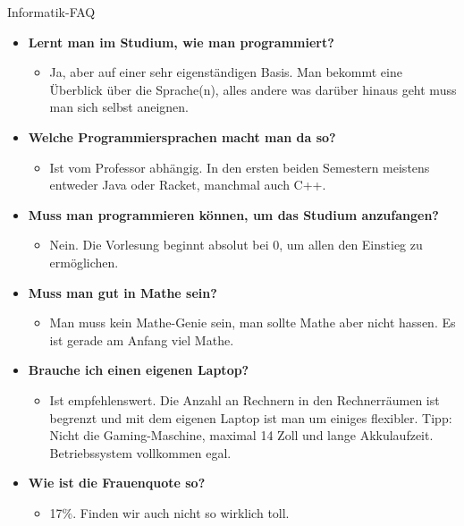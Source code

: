 \begin{LARGE}
	Informatik-FAQ
\end{LARGE}
\begin{large}
\begin{itemize}
		\item \textbf{Lernt man im Studium, wie man programmiert?}
		\begin{itemize}
			\item Ja, aber auf einer sehr eigenständigen Basis. Man bekommt eine Überblick über die Sprache(n), alles andere was darüber hinaus geht muss man sich selbst aneignen.
		\end{itemize}
	
		\item \textbf{Welche Programmiersprachen macht man da so?}
		\begin{itemize}
			\item Ist vom Professor abhängig. In den ersten beiden Semestern meistens entweder Java oder Racket, manchmal auch C++.
		\end{itemize}

		\item \textbf{Muss man programmieren können, um das Studium anzufangen?}
		\begin{itemize}
			\item Nein. Die Vorlesung beginnt absolut bei 0, um allen den Einstieg zu ermöglichen.
		\end{itemize}

	
		\item \textbf{Muss man gut in Mathe sein?}
		\begin{itemize}
			\item Man muss kein Mathe-Genie sein, man sollte Mathe aber nicht hassen. Es ist gerade am Anfang viel Mathe.
		\end{itemize}
	

		\item \textbf{Brauche ich einen eigenen Laptop?}
		\begin{itemize}
			\item Ist empfehlenswert. Die Anzahl an Rechnern in den Rechnerräumen ist begrenzt und mit dem eigenen Laptop ist man um einiges flexibler. Tipp: Nicht die Gaming-Maschine, maximal 14 Zoll und lange Akkulaufzeit. Betriebssystem vollkommen egal.
		\end{itemize}

	

		\item \textbf{Wie ist die Frauenquote so?}
		\begin{itemize}
			\item 17\%. Finden wir auch nicht so wirklich toll.
		\end{itemize}


\end{itemize}
\end{large}
